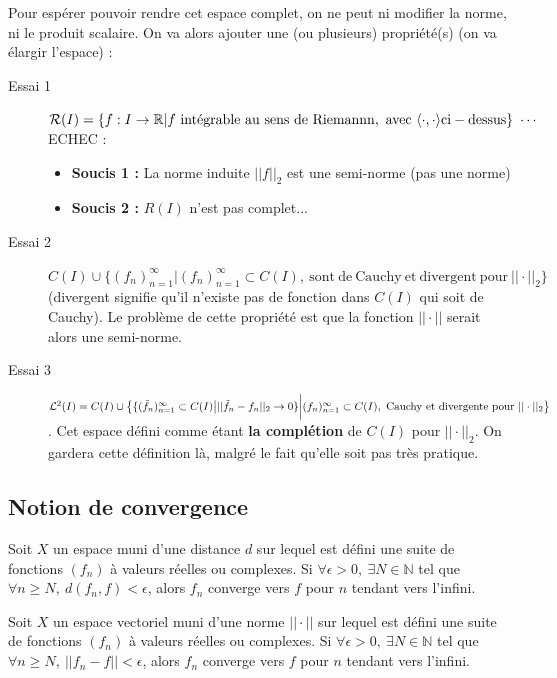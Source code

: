 Pour espérer pouvoir rendre cet espace complet, on ne peut ni modifier la norme, ni le produit scalaire. On va alors ajouter une (ou plusieurs) propriété(s) (on va élargir l'espace) :
\begin{description}
    \item[Essai 1] $\mathcal{R}(I) = \{ f:I\to\mathbb{R} | f \ \mathrm{int\Acute{e}grable\ au\ sens\ de\ Riemannn,\ avec}\ \langle\cdot,\cdot\rangle \mathrm{ci-dessus} \} \ \cdots$ ECHEC :
        \begin{itemize}
            \item \textbf{Soucis 1 :} La norme induite $||f||_2$ est une semi-norme (pas une norme)
            \item \textbf{Soucis 2 :} $R(I)$ n'est pas complet...
        \end{itemize}
    \item[Essai 2] $C(I)\cup\{ (f_n)_{n=1}^\infty \big| (f_n)_{n=1}^\infty \subset C(I),\ \mathrm{sont\ de\ Cauchy\ et\ divergent\ pour}\ ||\cdot||_2\}$ (divergent signifie qu'il n'existe pas de fonction dans $C(I)$ qui soit de Cauchy). Le problème de cette propriété est que la fonction $||\cdot||$ serait alors une semi-norme.
    \item[Essai 3] $\mathcal{L}^2(I) = C(I)\cup\big\{ \{ (\Tilde{f}_n)_{n=1}^\infty\subset C(I)\big| ||\Tilde{f}_n-f_n||_2\to0 \}\bigg| (f_n)_{n=1}^\infty\subset C(I),\ \mathrm{Cauchy\ et\ divergente\ pour}\ ||\cdot||_2 \big\}$. Cet espace défini comme étant \textbf{la complétion} de $C(I)$ pour $||\cdot||_2$. On gardera cette définition là, malgré le fait qu'elle soit pas très pratique.
\end{description}


\subsection{Notion de convergence}

\begin{definition}
    Soit $X$ un espace muni d'une distance $d$ sur lequel est défini une suite de fonctions $(f_n)$ à valeurs réelles ou complexes. Si $\forall \epsilon > 0,\ \exists N\in\mathbb{N}$ tel que $\forall n\geq N,\ d(f_n,f)<\epsilon$, alors $f_n$ converge vers $f$ pour $n$ tendant vers l'infini.
\end{definition}

\begin{definition}
    Soit $X$ un espace vectoriel muni d'une norme $||\cdot||$ sur lequel est défini une suite de fonctions $(f_n)$ à valeurs réelles ou complexes. Si $\forall \epsilon > 0,\ \exists N\in\mathbb{N}$ tel que $\forall n\geq N,\ ||f_n - f||<\epsilon$, alors $f_n$ converge vers $f$ pour $n$ tendant vers l'infini.
\end{definition}


